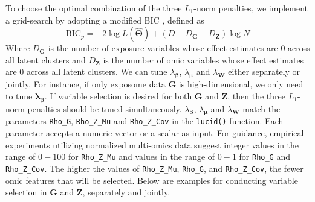 To choose the optimal combination of the three \(L_1\)-norm penalties, we
implement a grid-search by adopting a modified BIC \citep{pan2007penalized},
defined as
\[\text{BIC}_p = -2 \log L(\hat{\boldsymbol{\mathbf{\Theta}}}) + (D - D_{\boldsymbol{\mathbf{G}}} - D_{\boldsymbol{\mathbf{Z}}})\log N
    \label{eq18}   \label{eq:eq18}\]
Where \(D_{\boldsymbol{\mathbf{G}}}\) is the number of exposure variables
whose effect estimates are 0 across all latent clusters and
\(D_{\boldsymbol{\mathbf{Z}}}\) is the number of omic variables whose
effect estimates are 0 across all latent clusters. We can tune
\(\lambda_{\boldsymbol{\mathbf{\beta}}}\),
\(\lambda_{\boldsymbol{\mathbf{\mu}}}\) and
\(\lambda_{\boldsymbol{\mathbf{W}}}\) either separately or jointly. For
instance, if only exposome data \(\boldsymbol{\mathbf{G}}\) is
high-dimensional, we only need to tune
\(\boldsymbol{\mathbf{\lambda}}_{\boldsymbol{\mathbf{\beta}}}\). If
variable selection is desired for both \(\boldsymbol{\mathbf{G}}\) and
\(\boldsymbol{\mathbf{Z}}\), then the three \(L_1\)-norm penalties should be
tuned simultaneously. \(\lambda_{\boldsymbol{\mathbf{\beta}}}\),
\(\lambda_{\boldsymbol{\mathbf{\mu}}}\) and
\(\lambda_{\boldsymbol{\mathbf{W}}}\) match the parameters \texttt{Rho\_G},
\texttt{Rho\_Z\_Mu} and \texttt{Rho\_Z\_Cov} in the \texttt{lucid()} function. Each parameter
accepts a numeric vector or a scalar as input. For guidance, empirical
experiments utilizing normalized multi-omics data suggest integer values
in the range of \(0 - 100\) for \texttt{Rho\_Z\_Mu} and values in the range of
\(0 - 1\) for \texttt{Rho\_G} and \texttt{Rho\_Z\_Cov}. The higher the values of
\texttt{Rho\_Z\_Mu}, \texttt{Rho\_G}, and \texttt{Rho\_Z\_Cov}, the fewer omic features that will
be selected. Below are examples for conducting variable selection in
\(\boldsymbol{\mathbf{G}}\) and \(\boldsymbol{\mathbf{Z}}\), separately and
jointly.

